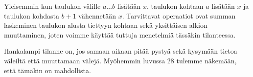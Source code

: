 Yleisemmin kun taulukon välille $a \ldots b$
lisätään $x$, taulukon kohtaan $a$
lisätään $x$ ja taulukon kohdasta $b+1$
vähennetään $x$.
Tarvittavat operaatiot 
ovat summan laskeminen
taulukon alusta tiettyyn kohtaan
sekä yksittäisen alkion muuttaminen,
joten voimme käyttää tuttuja menetelmiä tässäkin tilanteessa.

Hankalampi tilanne on, jos samaan aikaan pitää pystyä
sekä kysymään tietoa väleiltä että muuttamaan välejä.
Myöhemmin luvussa 28 tulemme näkemään,
että tämäkin on mahdollista.



